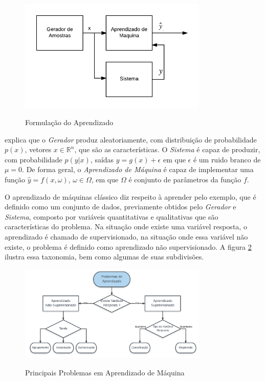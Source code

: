 \begin{figure}[!htb]
	\centering
	\caption{Formulação do Aprendizado} 
	\includegraphics[width=0.8\textwidth]{./04-figuras/MLForm.png}
	\label{fig:MLFormulation}
\end{figure}

 explica que o \textit{Gerador} produz aleatoriamente, com distribuição de probabilidade $p(x)$, vetores $x \in {\mathbb {R}} ^{n}$, que são as características. O \textit{Sistema} é capaz de produzir, com probabilidade $p(y | x)$, saídas $y = g(x) + \epsilon$ em que $\epsilon$ é um ruido branco de $\mu = 0$. De forma geral, o \textit{Aprendizado de Máquina} é capaz de implementar uma função $\hat{y} = f(x, \omega)$, $\omega \in \Omega$, em que $\Omega$ é conjunto de parâmetros da função $f$.

O aprendizado de máquinas clássico diz respeito à aprender pelo exemplo, que é definido como um conjunto de dados, previamente obtidos pelo \textit{Gerador} e \textit{Sistema}, composto por variáveis quantitativas e qualitativas que são características do problema. Na situação onde existe uma variável resposta, o aprendizado é chamado de supervisionado, na situação onde essa variável não existe, o problema é definido como aprendizado não supervisionado. A figura \ref{fig:MLProblems} ilustra essa taxonomia, bem como algumas de suas subdivisões.


\begin{figure}[!htb]
	\centering
	\caption{Principais Problemas em Aprendizado de Máquina} 
	\includegraphics[width=0.8\textwidth]{./04-figuras/MLProblems.png}
	\label{fig:MLProblems}
\end{figure}
